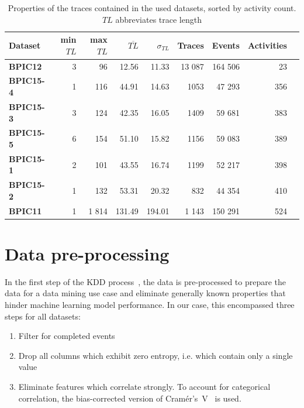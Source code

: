 \begin{table}
  \centering
  \begin{adjustbox}{center}
  \begin{tabular}{lrrrrrrrr}
  \textbf{Dataset} & \textbf{min $TL$} & \textbf{max $TL$} & \textbf{$\overline{TL}$} & \textbf{$\sigma_{TL}$} & \textbf{Traces} & \textbf{Events} & \textbf{Activities} \\
  \hline
  \textbf{BPIC12}   & 3 & 96  & 12.56 & 11.33 & 13 087 & 164 506 & 23\\
  \textbf{BPIC15-4} & 1 & 116 & 44.91 & 14.63 & 1053 & 47 293 & 356\\
  \textbf{BPIC15-3} & 3 & 124 & 42.35 & 16.05 & 1409 & 59 681 & 383\\
  \textbf{BPIC15-5} & 6 & 154 & 51.10 & 15.82 & 1156 & 59 083 & 389\\
  \textbf{BPIC15-1} & 2 & 101 & 43.55 & 16.74 & 1199 & 52 217 & 398\\
  \textbf{BPIC15-2} & 1 & 132 & 53.31 & 20.32 & 832 & 44 354 & 410\\
  \textbf{BPIC11}  & 1 & 1 814& 131.49&194.01 & 1 143 & 150 291 & 524
  \end{tabular}
  \end{adjustbox}
  \caption[Trace properties in each dataset]{Properties of the traces contained in the used datasets, sorted by activity count. $TL$ abbreviates trace length}
  \label{tab:dataset-characteristics}
\end{table}

\section{Data pre-processing}
\label{sec:eval:data-preprocessing}
In the first step of the KDD process~\cite{fayyad1996data}, the data is pre-processed to prepare the data for a data mining use case and eliminate generally known properties that hinder machine learning model performance. In our case, this encompassed three steps for all datasets:

\begin{enumerate}
    \item Filter for completed events
    \item Drop all columns which exhibit zero entropy, i.e. which contain only a single value
    \item Eliminate features which correlate strongly. To account for categorical correlation, the bias-corrected version of Cramér's~V~\cite{bergsma2013bias} is used.
\end{enumerate}

